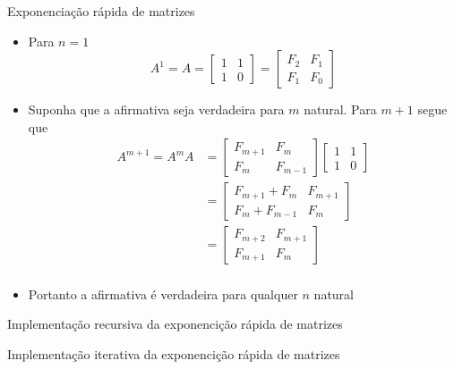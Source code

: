\begin{frame}[fragile]{Exponenciação rápida de matrizes}

    \begin{itemize}
        \item Para $n = 1$ 
        \[
            A^1 = A = \begin{bmatrix} 1 & 1 \\ 1 & 0\end{bmatrix} = 
            \begin{bmatrix} F_2 & F_1 \\ F_1 & F_0\end{bmatrix}
        \]

        \item Suponha que a afirmativa seja verdadeira para $m$ natural. Para $m+1$ segue que
        \begin{align*}
            A^{m + 1} = A^mA &= \begin{bmatrix} F_{m + 1} & F_m \\ F_m & F_{m - 1}\end{bmatrix}
            \begin{bmatrix} 1 & 1 \\ 1 & 0\end{bmatrix} \\
            &= \begin{bmatrix} F_{m + 1} + F_m & F_{m + 1} \\ F_m  + F_{m - 1}& F_m\end{bmatrix} \\
            &= \begin{bmatrix} F_{m + 2} & F_{m + 1} \\ F_{m + 1} & F_{m}\end{bmatrix} \\
        \end{align*}

        \item Portanto a afirmativa é verdadeira para qualquer $n$ natural
    \end{itemize}

\end{frame}
\begin{frame}[fragile]{Implementação recursiva da exponencição rápida de matrizes}
\end{frame}

\begin{frame}[fragile]{Implementação iterativa da exponencição rápida de matrizes}
\end{frame}

